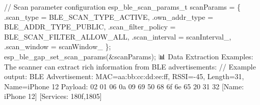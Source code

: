 // Scan parameter configuration esp\+\_\+ble\+\_\+scan\+\_\+params\+\_\+t scan\+Params = \{ .scan\+\_\+type = BLE\+\_\+\+SCAN\+\_\+\+TYPE\+\_\+\+ACTIVE, .own\+\_\+addr\+\_\+type = BLE\+\_\+\+ADDR\+\_\+\+TYPE\+\_\+\+PUBLIC, .scan\+\_\+filter\+\_\+policy = BLE\+\_\+\+SCAN\+\_\+\+FILTER\+\_\+\+ALLOW\+\_\+\+ALL, .scan\+\_\+interval = scan\+Interval\+\_\+, .scan\+\_\+window = scan\+Window\+\_\+ \}; esp\+\_\+ble\+\_\+gap\+\_\+set\+\_\+scan\+\_\+params(\&scan\+Params); 📊 Data Extraction Examples\+: The scanner can extract rich information from BLE advertisements\+: // Example output\+: BLE Advertisement\+: MAC=aa\+:bb\+:cc\+:dd\+:ee\+:ff, RSSI=-\/45, Length=31, Name=i\+Phone 12 Payload\+: 02 01 06 0a 09 69 50 68 6f 6e 65 20 31 32 \mbox{[}Name\+: i\+Phone 12\mbox{]} \mbox{[}Services\+: 180f,1805\mbox{]} 